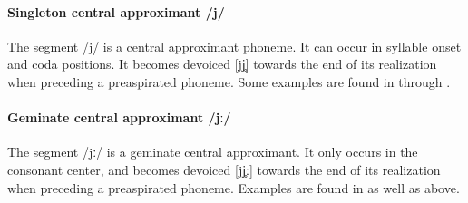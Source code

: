 \paragraph{Singleton central approximant /j/}
The segment /j/ is a central approximant phoneme. It can occur in syllable onset and coda positions. 
It becomes devoiced [jj̥] towards the end of its realization when preceding a preaspirated phoneme. 
Some examples are found in  through . 
%

\paragraph{Geminate central approximant /jː/}
The segment /jː/ is a geminate central approximant. It only occurs in the consonant center, and becomes devoiced [jj̥ː] towards the end of its realization when preceding a preaspirated phoneme.  
Examples are found in  as well as  above.


